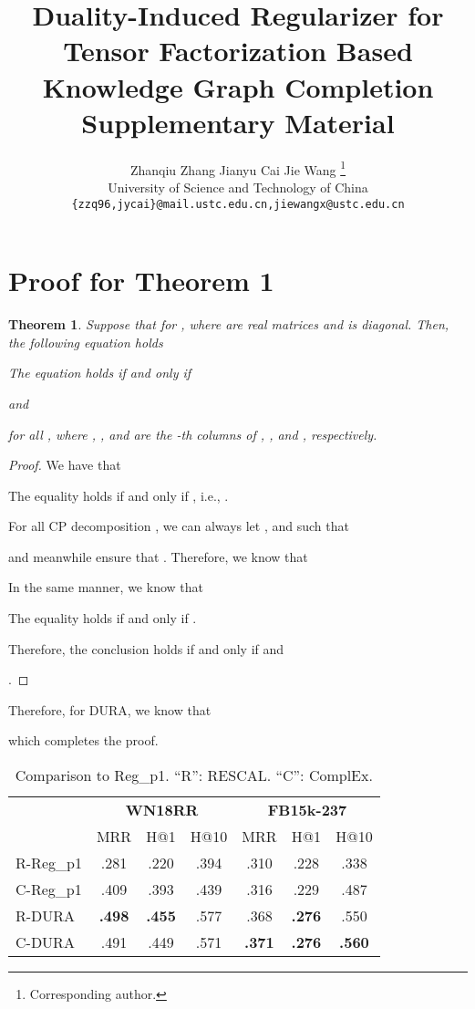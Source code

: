 \documentclass{article}
\title{Duality-Induced Regularizer for Tensor Factorization Based Knowledge Graph Completion\\
\vspace{3mm}
Supplementary Material}
\author{Zhanqiu Zhang \qquad
  Jianyu Cai \qquad
  Jie Wang \thanks{Corresponding author.} \vspace{1mm}\\
University of Science and Technology of China\\
\texttt{\{zzq96,jycai\}@mail.ustc.edu.cn,jiewangx@ustc.edu.cn}
}
\newtheorem{theorem}{Theorem}
\begin{document}
\maketitle

\section{Proof for Theorem 1}
\begin{theorem}\label{thm:main}
Suppose that  for , where  are real matrices and  is diagonal. Then, the following equation holds

The equation holds if and only if

and

for all ,
where , , and  are the -th columns of , , and , respectively.
\end{theorem}

\begin{proof}
We have that

The equality holds if and only if , i.e., .

For all CP decomposition ,  we can always let ,  and  such that

and meanwhile ensure that . Therefore, we know that

In the same manner, we know that

The equality holds if and only if .

Therefore, the conclusion holds if and only if 
and

.
\end{proof}

Therefore, for DURA, we know that 

which completes the proof.




\begin{table}[ht]
    \centering
    \caption{Comparison to Reg\_p1. ``R'': RESCAL. ``C'': ComplEx. }    \label{table:cmp_results}
        \vskip 0.1in
        \begin{tabular}{l  c c c  c c c }
            \toprule
              &\multicolumn{3}{c}{\textbf{WN18RR}}&  \multicolumn{3}{c}{\textbf{FB15k-237}} \\
             \cmidrule(lr){2-4}
             \cmidrule(lr){5-7}
             & MRR & H@1 & H@10 & MRR & H@1 & H@10 \\
            \midrule
            R-Reg\_p1   &.281 &.220 &.394 &.310 &.228 &.338\\
            C-Reg\_p1   &.409 &.393 &.439 &.316 &.229 &.487\\
            \midrule
            R-DURA    &\textbf{.498} &\textbf{.455} &.577 &.368 &\textbf{.276} &.550 \\
            C-DURA &.491 &.449 &.571 &\textbf{.371} &\textbf{.276} &\textbf{.560} \\
            \bottomrule
        \end{tabular}
\end{table}
\end{document}
